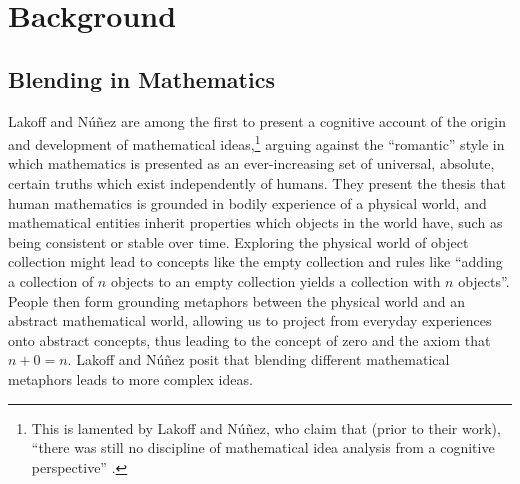 \section{Background}
\label{sec:background}

\subsection{Blending in Mathematics}
\label{subsec:mathblend}


Lakoff and N{\'u}{\~n}ez \citep{Lak00} are among the first to present
a cognitive account of the origin and development of mathematical
ideas,\footnote{This is lamented by Lakoff and N{\'u}{\~n}ez, who
claim that (prior to their work), ``there was still no discipline of
mathematical idea analysis from a cognitive perspective''
\citep{Lak00}.} arguing against the ``romantic'' style in which
mathematics is presented as an ever-increasing set of universal,
absolute, certain truths which exist independently of humans. They
present the thesis that human mathematics is grounded in bodily
experience of a physical world, and mathematical entities inherit
properties which objects in the world have, such as being consistent
or stable over time.  Exploring the physical world of object
collection might lead to concepts like the empty collection and rules
like ``adding a collection of $n$ objects to an empty collection
yields a collection with $n$ objects''. People then form grounding
metaphors between the physical world and an abstract mathematical
world, allowing us to project from everyday experiences onto abstract
concepts, thus leading to the concept of zero and the axiom that $n +
0 = n$. Lakoff and N{\'u}{\~n}ez posit that blending different
mathematical metaphors leads to more complex ideas. 



